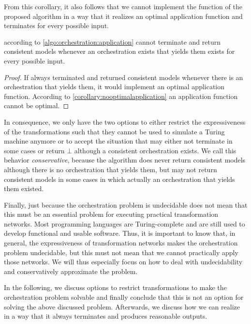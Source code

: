 From this corollary, it also follows that we cannot implement the  function of the proposed algorithm in a way that it realizes an optimal application function and terminates for every possible input.

\begin{corollary}
     according to \autoref{algo:orchestration:application} cannot terminate and return consistent models whenever an orchestration exists that yields them exists for every possible input.
\end{corollary}
\begin{proof}
    If  always terminated and returned consistent models whenever there is an orchestration that yields them, it would implement an optimal application function. %
    According to \autoref{corollary:nooptimalapplication} an application function cannot be optimal.
\end{proof}

In consequence, we only have the two options to either restrict the expressiveness of the transformations such that they cannot be used to simulate a Turing machine anymore or to accept the situation that  may either not terminate in some cases or return $\bot$ although a consistent orchestration exists.
We call this behavior \emph{conservative}, because the algorithm does never return consistent models although there is no orchestration that yields them, but may not return consistent models in some cases in which actually an orchestration that yields them existed.

Finally, just because the orchestration problem is undecidable does not mean that this must be an essential problem for executing practical transformation networks.
Most programming languages are Turing-complete and are still used to develop functional and usable software.
Thus, it is important to know that, in general, the expressiveness of transformation networks makes the orchestration problem undecidable, but this must not mean that we cannot practically apply those networks.
We will thus especially focus on how to deal with undecidability and conservatively approximate the problem.

In the following, we discuss options to restrict transformations to make the orchestration problem solvable and finally conclude that this is not an option for solving the above discussed problem.
Afterwards, we discuss how we can realize  in a way that it always terminates and produces reasonable outputs.

